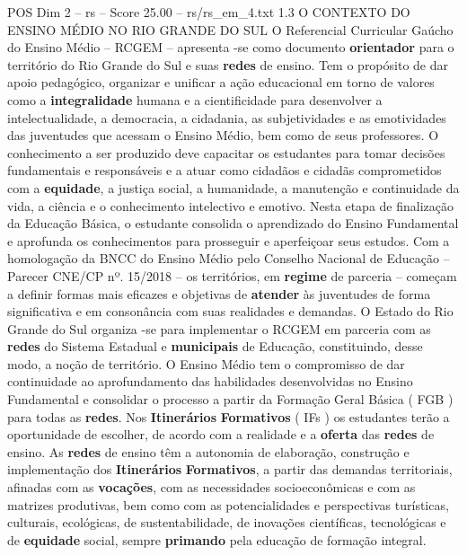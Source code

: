 \begin{textsample}{POS Dim 2 – rs – Score 25.00 – rs/rs\_em\_4.txt}  \label{ex:f2_pos_080}
1.3 O CONTEXTO DO ENSINO MÉDIO NO RIO GRANDE DO SUL O Referencial Curricular Gaúcho do Ensino Médio – RCGEM – apresenta -se como documento \textbf{orientador} para o território do Rio Grande do Sul e suas \textbf{redes} de ensino.
Tem o propósito de dar apoio pedagógico, organizar e unificar a ação educacional em torno de valores como a \textbf{integralidade} humana e a cientificidade para desenvolver a intelectualidade, a democracia, a cidadania, as subjetividades e as emotividades das juventudes que acessam o Ensino Médio, bem como de seus professores.
O conhecimento a ser produzido deve capacitar os estudantes para tomar decisões fundamentais e responsáveis e a atuar como cidadãos e cidadãs comprometidos com a \textbf{equidade}, a justiça social, a humanidade, a manutenção e continuidade da vida, a ciência e o conhecimento intelectivo e emotivo.
Nesta etapa de finalização da Educação Básica, o estudante consolida o aprendizado do Ensino Fundamental e aprofunda os conhecimentos para prosseguir e aperfeiçoar seus estudos.
Com a homologação da BNCC do Ensino Médio pelo Conselho Nacional de Educação – Parecer CNE/CP nº. 15/2018 – os territórios, em \textbf{regime} de parceria – começam a definir formas mais eficazes e objetivas de \textbf{atender} às juventudes de forma significativa e em consonância com suas realidades e demandas.
O Estado do Rio Grande do Sul organiza -se para implementar o RCGEM em parceria com as \textbf{redes} do Sistema Estadual e \textbf{municipais} de Educação, constituindo, desse modo, a noção de território.
O Ensino Médio tem o compromisso de dar continuidade ao aprofundamento das habilidades desenvolvidas no Ensino Fundamental e consolidar o processo a partir da Formação Geral Básica ( FGB ) para todas as \textbf{redes}.
Nos \textbf{Itinerários} \textbf{Formativos} ( IFs ) os estudantes terão a oportunidade de escolher, de acordo com a realidade e a \textbf{oferta} das \textbf{redes} de ensino.
As \textbf{redes} de ensino têm a autonomia de elaboração, construção e implementação dos \textbf{Itinerários} \textbf{Formativos}, a partir das demandas territoriais, afinadas com as \textbf{vocações}, com as necessidades socioeconômicas e com as matrizes produtivas, bem como com as potencialidades e perspectivas turísticas, culturais, ecológicas, de sustentabilidade, de inovações científicas, tecnológicas e de \textbf{equidade} social, sempre \textbf{primando} pela educação de formação integral.

\end{textsample}
